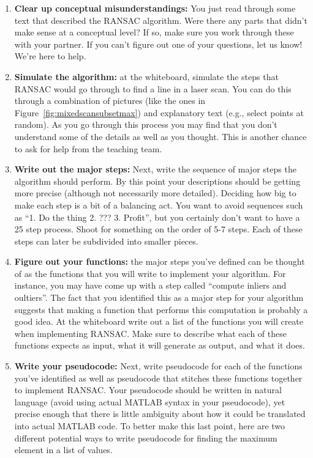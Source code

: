 \documentclass{tufte-handout}
\begin{document}
\begin{enumerate}
\item \textbf{Clear up conceptual misunderstandings:} You just read through some text that described the RANSAC algorithm.  Were there any parts that didn't make sense at a conceptual level?  If so, make sure you work through these with your partner.  If you can't figure out one of your questions, let us know!  We're here to help.
\item \textbf{Simulate the algorithm:} at the whiteboard, simulate the steps that RANSAC would go through to find a line in a laser scan.  You can do this through a combination of pictures (like the ones in Figure~\ref{fig:mixedscansubsetmax}) and explanatory text (e.g., select points at random).  As you go through this process you may find that you don't understand some of the details as well as you thought.  This is another chance to ask for help from the teaching team.
\item \textbf{Write out the major steps:} Next, write the sequence of major steps the algorithm should perform.  By this point your descriptions should be getting more precise (although not necessarily more detailed).  Deciding how big to make each step is a bit of a balancing act.  You want to avoid sequences such as ``1.  Do the thing 2.  ??? 3.  Profit'', but you certainly don't want to have a 25 step process.  Shoot for something on the order of 5-7 steps.  Each of these steps can later be subdivided into smaller pieces.
\item \textbf{Figure out your functions:} the major steps you've defined can be thought of as the functions that you will write to implement your algorithm.  For instance, you may have come up with a step called ``compute inliers and oultiers''.  The fact that you identified this as a major step for your algorithm suggests that making a function that performs this computation is probably a good idea.  At the whiteboard write out a list of the functions you will create when implementing RANSAC.  Make sure to describe what each of these functions expects as input, what it will generate as output, and what it does.
\item \textbf{Write your pseudocode:}  Next, write pseudocode for each of the functions you've identified as well as  pseudocode that stitches these functions together to implement RANSAC.  Your pseudocode should be written in natural language (avoid using actual MATLAB syntax in your pseudocode), yet precise enough that there is little ambiguity about how it could be translated into actual MATLAB code.  To better make this last point, here are two different potential ways to write pseudocode for finding the maximum element in a list of values.


\end{enumerate}
\end{document}
